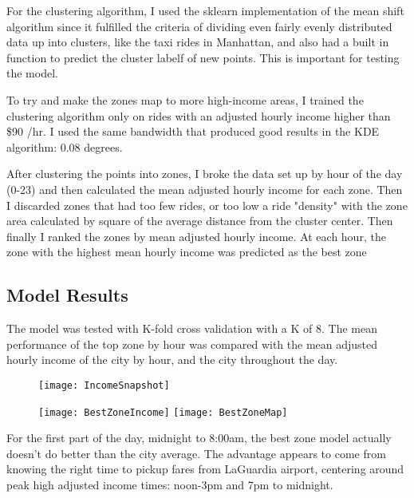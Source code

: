 \documentclass[10pt]{article} %
\begin{document}
For the clustering algorithm, I used the sklearn implementation of the mean shift algorithm since it fulfilled the criteria of dividing even fairly evenly distributed data up into clusters, like the taxi rides in Manhattan, and also had a built in function to predict the cluster labelf of new points. This is important for testing the model.

To try and make the zones map to more high-income areas, I trained the clustering algorithm only on rides with an adjusted hourly income higher than \$90 /hr. I used the same bandwidth that produced good results in the KDE algorithm: 0.08 degrees.

After clustering the points into zones, I broke the data set up by hour of the day (0-23) and then calculated the mean adjusted hourly income for each zone. Then I discarded zones that had too few rides, or too low a ride "density" with the zone area calculated by square of the average distance from the cluster center. Then finally I ranked the zones by mean adjusted hourly income. At each hour, the zone with the highest mean hourly income was predicted as the best zone

\subsection*{Model Results}
The model was tested with K-fold cross validation with a K of 8. The mean performance of the top zone by hour was compared with the mean adjusted hourly income of the city by hour, and the city throughout the day.

\begin{figure}[h!]
	\centering
	\texttt{[image: IncomeSnapshot]}
	\caption{}
\end{figure}

\begin{figure}[h!]
	\centering
	\texttt{[image: BestZoneIncome]}
	\texttt{[image: BestZoneMap]}
	\caption{}
\end{figure}

For the first part of the day, midnight to 8:00am, the best zone model actually doesn't do better than the city average. The advantage appears to come from knowing the right time to pickup fares from LaGuardia airport, centering around peak high adjusted income times: noon-3pm and 7pm to midnight.
\end{document}

